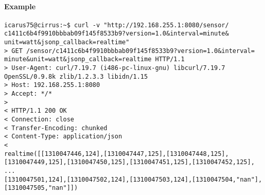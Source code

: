 \paragraph{Example}
\begin{Verbatim}
icarus75@cirrus:~$ curl -v "http://192.168.255.1:8080/sensor/
c1411c6b4f9910bbbab09f145f8533b9?version=1.0&interval=minute&
unit=watt&jsonp_callback=realtime"
> GET /sensor/c1411c6b4f9910bbbab09f145f8533b9?version=1.0&interval=
minute&unit=watt&jsonp_callback=realtime HTTP/1.1
> User-Agent: curl/7.19.7 (i486-pc-linux-gnu) libcurl/7.19.7
OpenSSL/0.9.8k zlib/1.2.3.3 libidn/1.15
> Host: 192.168.255.1:8080
> Accept: */*
> 
< HTTP/1.1 200 OK
< Connection: close
< Transfer-Encoding: chunked
< Content-Type: application/json
< 
realtime([[1310047446,124],[1310047447,125],[1310047448,125],
[1310047449,125],[1310047450,125],[1310047451,125],[1310047452,125], ...
[1310047501,124],[1310047502,124],[1310047503,124],[1310047504,"nan"],
[1310047505,"nan"]])
\end{Verbatim}
